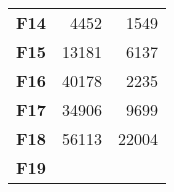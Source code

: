 \documentclass[12pt,a4paper]{article}
\begin{document}
\begin{longtable}[c]{@{}crr@{}}
\begin{minipage}[t]{0.13\columnwidth}
\textbf{F14}
\strut\end{minipage} &
\begin{minipage}[t]{0.09\columnwidth}\raggedleft\strut
4452
\strut\end{minipage} &
\begin{minipage}[t]{0.25\columnwidth}\raggedleft\strut
1549
\strut\end{minipage}\tabularnewline
\begin{minipage}[t]{0.13\columnwidth}\centering\strut
\textbf{F15}
\strut\end{minipage} &
\begin{minipage}[t]{0.09\columnwidth}\raggedleft\strut
13181
\strut\end{minipage} &
\begin{minipage}[t]{0.25\columnwidth}\raggedleft\strut
6137
\strut\end{minipage}\tabularnewline
\begin{minipage}[t]{0.13\columnwidth}\centering\strut
\textbf{F16}
\strut\end{minipage} &
\begin{minipage}[t]{0.09\columnwidth}\raggedleft\strut
40178
\strut\end{minipage} &
\begin{minipage}[t]{0.25\columnwidth}\raggedleft\strut
2235
\strut\end{minipage}\tabularnewline
\begin{minipage}[t]{0.13\columnwidth}\centering\strut
\textbf{F17}
\strut\end{minipage} &
\begin{minipage}[t]{0.09\columnwidth}\raggedleft\strut
34906
\strut\end{minipage} &
\begin{minipage}[t]{0.25\columnwidth}\raggedleft\strut
9699
\strut\end{minipage}\tabularnewline
\begin{minipage}[t]{0.13\columnwidth}\centering\strut
\textbf{F18}
\strut\end{minipage} &
\begin{minipage}[t]{0.09\columnwidth}\raggedleft\strut
56113
\strut\end{minipage} &
\begin{minipage}[t]{0.25\columnwidth}\raggedleft\strut
22004
\strut\end{minipage}\tabularnewline
\begin{minipage}[t]{0.13\columnwidth}\centering\strut
\textbf{F19}
\strut\end{minipage} &

\end{longtable}
\end{document}
